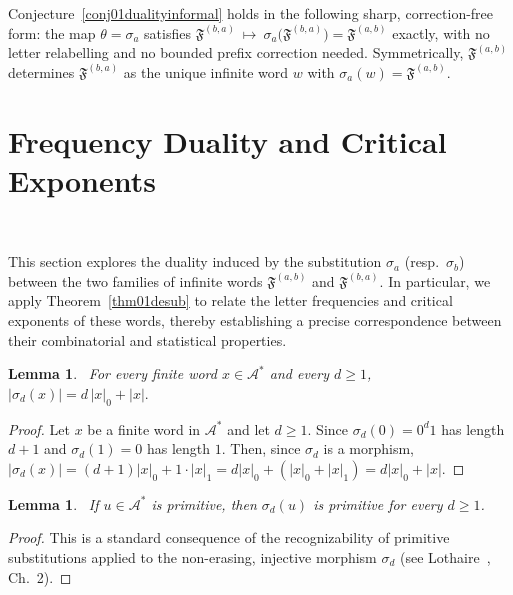 \documentclass[12pt]{amsart}
\theoremstyle{plain}
\newtheorem{lemma}[theorem]{Lemma}
\theoremstyle{definition}
\theoremstyle{remark}
\newcommand{\AlphA}{\mathcal{A}}
\newcommand{\FD}{\mathfrak{F}}
\begin{document}
Conjecture~\ref{conj01dualityinformal} holds in the following sharp,
correction-free form: the map $\theta=\sigma_a$ satisfies $\FD^{(b,a)} \ \longmapsto\ \sigma_a\bigl(\FD^{(b,a)}\bigr)=\FD^{(a,b)}$
exactly, with no letter relabelling and no bounded prefix correction
needed. Symmetrically, $\FD^{(a,b)}$ determines $\FD^{(b,a)}$ as the unique
infinite word $w$ with $\sigma_a(w)=\FD^{(a,b)}$. 


\section{Frequency Duality and Critical Exponents}~\label{sec04ceduality}

This section explores the duality induced by the substitution $\sigma_a$ (resp.\ $\sigma_b$) between the two families of infinite words $\FD^{(a,b)}$ and $\FD^{(b,a)}$. In particular, we apply Theorem~\ref{thm01desub} to relate the letter frequencies and critical exponents of these words, thereby establishing a precise correspondence between their combinatorial and statistical properties.

\begin{lemma}~\label{lem01length}
For every finite word $x\in\AlphA^{*}$ and every $d\geqslant 1$, $|\sigma_d(x)| = d\,|x|_0 + |x|.$
\end{lemma}
\begin{proof}
Let $x$ be a finite word in $\AlphA^{*}$ and let $d\geqslant 1$. Since $\sigma_d(0)=0^d1$ has length $d+1$ and $\sigma_d(1)=0$ has length $1$. Then, since $\sigma_d$ is a morphism, $|\sigma_d(x)| = (d+1)|x|_0 + 1\cdot|x|_1 =
d|x|_0 + (|x|_0+|x|_1) = d|x|_0+|x|$.
\end{proof}

\begin{lemma}~\label{lem01primitivity}
If $u\in\AlphA^{*}$ is primitive,
then $\sigma_d(u)$ is primitive for every $d\geqslant 1$.
\end{lemma}
\begin{proof}
This is a standard consequence of the recognizability of primitive
substitutions applied to the
non-erasing, injective morphism $\sigma_d$ (see
Lothaire~\cite{Lothaire2002}, Ch.~2). 
\end{proof}
\end{document}
